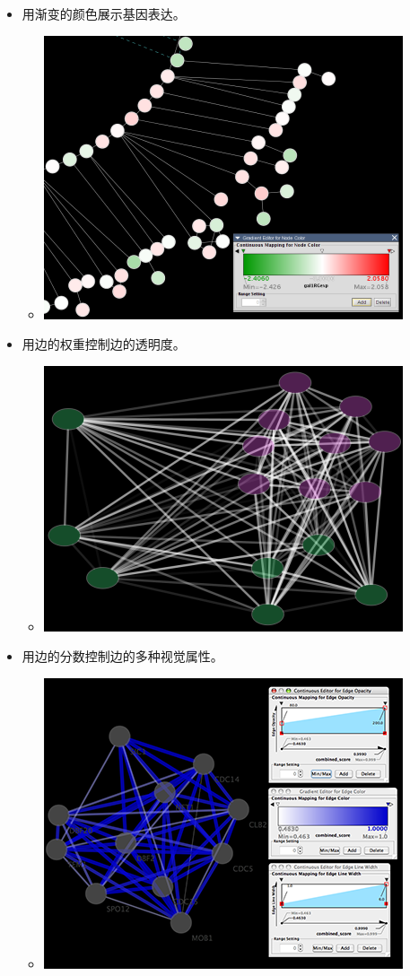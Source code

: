 \begin{itemize}
\item 用渐变的颜色展示基因表达。\begin{itemize}
\item \centerline{
 \includegraphics[width=.6\textwidth]{images/ColorGradient.png} }
\end{itemize}

\item 用边的权重控制边的透明度。\begin{itemize}
\item \centerline{
 \includegraphics[width=.6\textwidth]{images/OpacityForEdges.png} }
\end{itemize}

\item 用边的分数控制边的多种视觉属性。\begin{itemize}
\item \centerline{
 \includegraphics[width=.6\textwidth]{images/MultipleEdgeMapping.png} }
\end{itemize}


\end{itemize}
